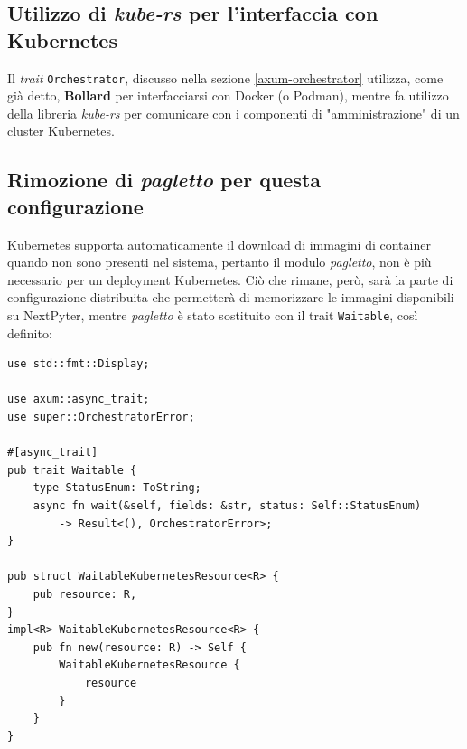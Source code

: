\subsection{Utilizzo di \textit{kube-rs} per l'interfaccia con Kubernetes}
Il \textit{trait} \verb|Orchestrator|, discusso nella sezione \ref{axum-orchestrator} utilizza, come già detto, \textbf{Bollard} per interfacciarsi con Docker (o Podman), mentre fa utilizzo della libreria \textit{kube-rs} per comunicare con i componenti di "amministrazione" di un cluster Kubernetes.
\subsection{Rimozione di \textit{pagletto} per questa configurazione}
Kubernetes supporta automaticamente il download di immagini di container quando non sono presenti nel sistema, pertanto il modulo \textit{pagletto}, non è più necessario per un deployment Kubernetes.
\newline
Ciò che rimane, però, sarà la parte di configurazione distribuita che permetterà di memorizzare le immagini disponibili su NextPyter, mentre \textit{pagletto} è stato sostituito con il trait \verb|Waitable|, così definito:
\begin{verbatim}
use std::fmt::Display;

use axum::async_trait;
use super::OrchestratorError;

#[async_trait]
pub trait Waitable {
    type StatusEnum: ToString;
    async fn wait(&self, fields: &str, status: Self::StatusEnum) 
        -> Result<(), OrchestratorError>;
}

pub struct WaitableKubernetesResource<R> {
    pub resource: R,
}
impl<R> WaitableKubernetesResource<R> {
    pub fn new(resource: R) -> Self {
        WaitableKubernetesResource {
            resource
        }
    }
}

\end{verbatim}

